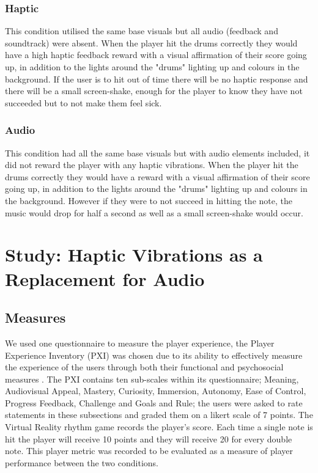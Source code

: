 \documentclass[manuscript,screen]{acmart}
\begin{document}
\subsubsection{Haptic}
This condition utilised the same base visuals but all audio (feedback and soundtrack) were absent. When the player hit the drums correctly they would have a high haptic feedback reward with a visual affirmation of their score going up, in addition to the lights around the "drums" lighting up and colours in the background. If the user is to hit out of time there will be no haptic response and there will be a small screen-shake, enough for the player to know they have not succeeded but to not make them feel sick.
\subsubsection{Audio}
This condition had all the same base visuals but with audio elements included, it did not reward the player with any haptic vibrations. When the player hit the drums correctly they would have a reward with a visual affirmation of their score going up, in addition to the lights around the "drums" lighting up and colours in the background. However if they were to not succeed in hitting the note, the music would drop for half a second as well as a small screen-shake would occur.

\section{Study: Haptic Vibrations as a Replacement for Audio }
\subsection{Measures}
We used one questionnaire to measure the player experience, the Player Experience Inventory (PXI) was chosen due to its ability to effectively measure the experience of the users through both their functional and psychosocial measures \cite{abeele2020development}. The PXI contains ten sub-scales within its questionnaire; Meaning, Audiovisual Appeal, Mastery, Curiosity, Immersion, Autonomy, Ease of Control, Progress Feedback, Challenge and Goals and Rule; the users were asked to rate statements in these subsections and graded them on a likert scale of 7 points. The Virtual Reality rhythm game records the player’s score. Each time a single note is hit the player will receive 10 points and they will receive 20 for every double note. This player metric was recorded to be evaluated as a measure of player performance between the two conditions. 
\end{document}
